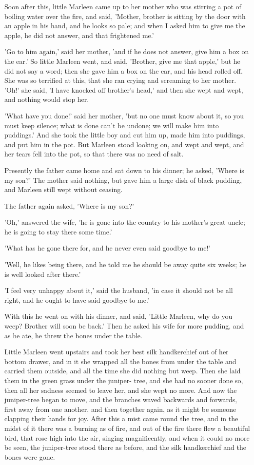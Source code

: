 \documentclass[12pt]{book}
\begin{document}
Soon after this, little Marleen came up to her mother who was stirring
a pot of boiling water over the fire, and said, 'Mother, brother is
sitting by the door with an apple in his hand, and he looks so pale;
and when I asked him to give me the apple, he did not answer, and that
frightened me.'

'Go to him again,' said her mother, 'and if he does not answer, give
him a box on the ear.' So little Marleen went, and said, 'Brother,
give me that apple,' but he did not say a word; then she gave him a
box on the ear, and his head rolled off. She was so terrified at this,
that she ran crying and screaming to her mother. 'Oh!' she said, 'I
have knocked off brother's head,' and then she wept and wept, and
nothing would stop her.

'What have you done!' said her mother, 'but no one must know about it,
so you must keep silence; what is done can't be undone; we will make
him into puddings.' And she took the little boy and cut him up, made
him into puddings, and put him in the pot. But Marleen stood looking
on, and wept and wept, and her tears fell into the pot, so that there
was no need of salt.

Presently the father came home and sat down to his dinner; he asked,
'Where is my son?' The mother said nothing, but gave him a large dish
of black pudding, and Marleen still wept without ceasing.

The father again asked, 'Where is my son?'

'Oh,' answered the wife, 'he is gone into the country to his mother's
great uncle; he is going to stay there some time.'

'What has he gone there for, and he never even said goodbye to me!'

'Well, he likes being there, and he told me he should be away quite
six weeks; he is well looked after there.'

'I feel very unhappy about it,' said the husband, 'in case it should
not be all right, and he ought to have said goodbye to me.'

With this he went on with his dinner, and said, 'Little Marleen, why
do you weep? Brother will soon be back.' Then he asked his wife for
more pudding, and as he ate, he threw the bones under the table.

Little Marleen went upstairs and took her best silk handkerchief out
of her bottom drawer, and in it she wrapped all the bones from under
the table and carried them outside, and all the time she did nothing
but weep. Then she laid them in the green grass under the juniper-
tree, and she had no sooner done so, then all her sadness seemed to
leave her, and she wept no more. And now the juniper-tree began to
move, and the branches waved backwards and forwards, first away from
one another, and then together again, as it might be someone clapping
their hands for joy. After this a mist came round the tree, and in the
midst of it there was a burning as of fire, and out of the fire there
flew a beautiful bird, that rose high into the air, singing
magnificently, and when it could no more be seen, the juniper-tree
stood there as before, and the silk handkerchief and the bones were
gone.
\end{document}
